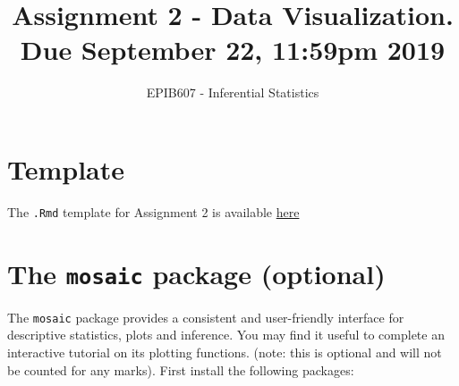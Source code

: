 \documentclass[letterpaper,11pt,twoside,]{pinp}
\title{Assignment 2 - Data Visualization. Due September 22, 11:59pm 2019}
\author[a]{EPIB607 - Inferential Statistics}
\affil[a]{Fall 2019, McGill University}
\begin{document}
\verticaladjustment{-2pt}

\maketitle
\thispagestyle{firststyle}



\hypertarget{template}{%
\section*{Template}\label{template}}

The \texttt{.Rmd} template for Assignment 2 is available
\href{https://github.com/sahirbhatnagar/EPIB607/raw/master/assignments/a2/a2_template.Rmd}{here}

\hypertarget{the-mosaic-package-optional}{%
\section*{\texorpdfstring{The \texttt{mosaic} package
(optional)}{The mosaic package (optional)}}\label{the-mosaic-package-optional}}

The \texttt{mosaic} package provides a consistent and user-friendly
interface for descriptive statistics, plots and inference. You may find
it useful to complete an interactive tutorial on its plotting functions.
(note: this is optional and will not be counted for any marks). First
install the following packages:

\begin{Shaded}
\begin{Highlighting}[]
\NormalTok{(}\NormalTok{(}\NormalTok{, }\NormalTok{), } \NormalTok{)}
\OperatorTok{::}\NormalTok{(}\NormalTok{)}
\end{Highlighting}
\end{Shaded}
\end{document}
